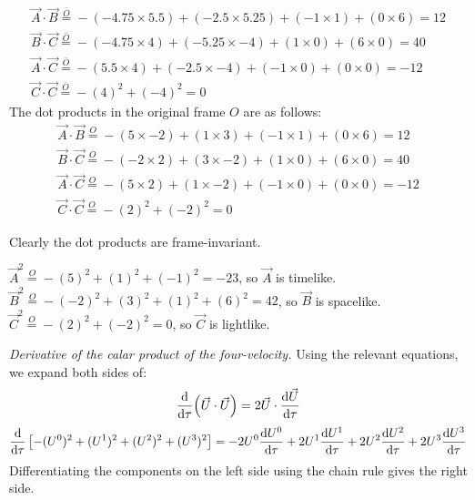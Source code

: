 \documentclass{report}
\begin{document}
\begin{subquests}
\begin{subquests}
		\item		
		\begin{gather*}
			\vec A \cdot \vec B \stackrel{\bar O} = -(-4.75 \times 5.5) + (-2.5 \times 5.25) + (-1 \times 1) + (0 \times 6) = 12 \\
			\vec B \cdot \vec C \stackrel{\bar O} = -(-4.75 \times 4) + (-5.25 \times -4) + (1 \times 0) + (6 \times 0) = 40 \\
			\vec A \cdot \vec C \stackrel{\bar O} = -(5.5 \times 4) + (-2.5 \times -4) + (-1 \times 0) + (0 \times 0) = -12 \\
			\vec C \cdot \vec C \stackrel{\bar O} = -(4)^2 + (-4)^2 = 0
		\end{gather*}
		The dot products in the original frame $O$ are as follows:
		\begin{gather*}
			\vec A \cdot \vec B \stackrel{O} = -(5 \times -2) + (1 \times 3) + (-1 \times 1) + (0 \times 6) = 12 \\ 
			\vec B \cdot \vec C \stackrel{O} = -(-2 \times 2) + (3 \times -2) + (1 \times 0) + (6 \times 0) = 40 \\
			\vec A \cdot \vec C \stackrel{O} = -(5 \times 2) + (1 \times -2) + (-1 \times 0) + (0 \times 0) = -12 \\
			\vec C \cdot \vec C \stackrel{O} = -(2)^2 + (-2)^2 = 0 	
		\end{gather*}
		 
		Clearly the dot products are frame-invariant.

		\item		
		$ \vec A^2 \stackrel{O} = -(5)^2 + (1)^2 + (-1)^2 = -23 $, so $\vec A$ is timelike.\\
		$ \vec B^2 \stackrel{O} = -(-2)^2 + (3)^2 + (1)^2 + (6)^2 = 42 $, so $\vec B$ is spacelike.\\
		$ \vec C^2 \stackrel{O} = -(2)^2 + (-2)^2 = 0 $, so $\vec C$ is lightlike.
	\end{subquests}

	\item \emph{Derivative of the calar product of the four-velocity.}
	Using the relevant equations, we expand both sides of:
	$$ \dv{\tau}(\vec U \cdot \vec U) = 2\vec U \cdot \dv{\vec U}{\tau} $$
	\begin{gather*}
		\dv{\tau}\left[-(U^0)^2 + (U^1)^2 + (U^2)^2 + (U^3)^2\right] = -2U^0\dv{U^0}{\tau} + 2U^1\dv{U^1}{\tau} + 2U^2\dv{U^2}{\tau} + 2U^3\dv{U^3}{\tau}
	\end{gather*}
	Differentiating the components on the left side using the chain rule gives the right side.


\end{subquests}
\end{document}
